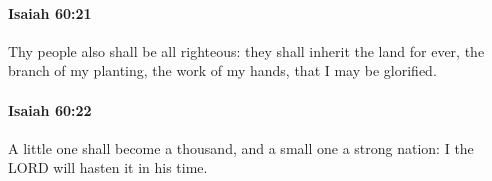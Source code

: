 		\paragraph{Isaiah 60:21} %
			\label{ISAIAH-60-21}

			Thy people also shall be all righteous: they shall inherit the land for ever, the branch of my planting, the work of my hands, that I may be glorified.


		\paragraph{Isaiah 60:22} %
			\label{ISAIAH-60-22}

			A little one shall become a thousand, and a small one a strong nation: I the LORD will hasten it in his time.

